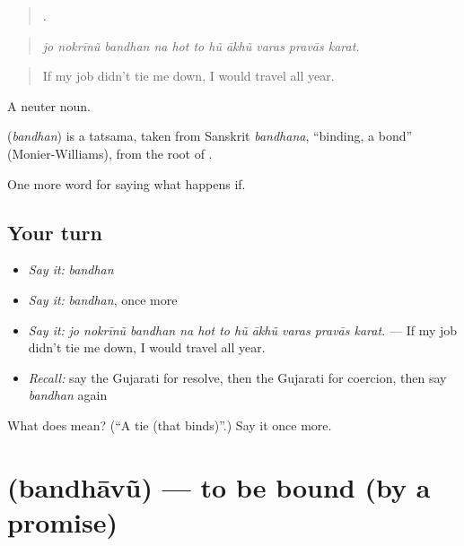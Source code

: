 \begin{quote}
          .
\end{quote}

\begin{quote}
\emph{jo nokrīnũ bandhan na hot to hũ ākhũ varas pravās karat.}
\end{quote}

\begin{quote}
If my job didn't tie me down, I would travel all year.
\end{quote}

A neuter noun.

\begin{cousinweb}
\textbf{} (\emph{bandhan}) is a tatsama, taken from Sanskrit \emph{bandhana}, \textquotedblleft{}binding, a bond\textquotedblright{} (Monier-Williams), from the root of \textbf{}.
\end{cousinweb}

\begin{grammarlens}[title={What you've built}]
One more word for saying what happens if.
\end{grammarlens}

\subsection*{Your turn}
\begin{itemize}
\raggedright
  \item \emph{Say it:} \emph{bandhan}
  \item \emph{Say it:} \emph{bandhan}, once more
  \item \emph{Say it:} \emph{jo nokrīnũ bandhan na hot to hũ ākhũ varas pravās karat.} — If my job didn't tie me down, I would travel all year.
  \item \emph{Recall:} say the Gujarati for resolve, then the Gujarati for coercion, then say \emph{bandhan} again
\end{itemize}

\begin{tcolorbox}[breakable,colback=teal!4,colframe=teal!35!black,title={Before you move on}]
What does  mean? (\textquotedblleft{}A tie (that binds)\textquotedblright{}.) Say it once more.
\end{tcolorbox}
\section[\texorpdfstring{\gu{બંધાવું} (bandhāvũ)}{બંધાવું (bandhāvũ)}]{ (bandhāvũ) — to be bound (by a promise)}

